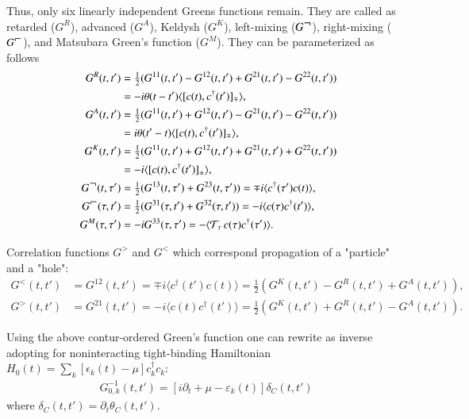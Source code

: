 Thus, only six linearly independent Greens functions remain. They are called as retarded ($G^R$), advanced ($G^A$), Keldysh ($G^K$), left-mixing ($G^{\mbox{$\neg$}}$), right-mixing ($G^{\rh}$), and Matsubara Green's function ($G^M$). They can be parameterized as follows
\begin{subequations}
\label{physical green def}
\begin{align}
G^R(t,t')
 &=
   \tfrac12(G^{11}(t,t')-G^{12}(t,t')+G^{21}(t,t')-G^{22}(t,t'))
\nonumber
\\
 &=
  -i\theta(t-t') \langle [c(t),c^\dagger(t')]_\mp \rangle,
\\
G^A(t,t')
 &=
   \tfrac12(G^{11}(t,t')+G^{12}(t,t')-G^{21}(t,t')-G^{22}(t,t'))
\nonumber
\\
 &=
  i\theta(t'-t) \langle [c(t),c^\dagger(t')]_\mp \rangle,
\label{advanced green def}
\\
G^K(t,t')
 &=
   \tfrac12(G^{11}(t,t')+G^{12}(t,t')+G^{21}(t,t')+G^{22}(t,t'))
\nonumber
\\
 &=
  -i \langle [c(t),c^\dagger(t')]_\pm \rangle,
\label{keldysh green function}
\\
G^{\lh}(t,\tau ')
 &=
   \tfrac12(G^{13}(t,\tau ')+G^{23}(t,\tau '))
 =
   \mp i \langle c^\dagger(\tau ') c(t) \rangle,
\\
G^{\rh}(\tau, t')
 &=
   \tfrac12(G^{31}(\tau,t')+G^{32}(\tau,t'))
 =
   -i\langle c(\tau) c^\dagger(t') \rangle,
\\ \:
\:G^M(\tau,\tau ')
 &=
   -iG^{33}(\tau,\tau')
 =
   -\langle \mathcal{T}_\tau\, c(\tau) c^\dagger(\tau ') \rangle.  
\end{align}
\end{subequations}

Correlation functions $G^{>}$ and $G^{<}$ which correspond propagation of a "particle" and a "hole":
\begin{align}
\label{gles def}
 G^<(t,t')
  &=
   G^{12}(t,t')
  =
   \mp i \langle c^\dagger(t') c(t) \rangle
  = \tfrac12
   (G^K(t,t')-G^R(t,t')+G^A(t,t')),  
 \\
\label{ggtr def}
 G^>(t,t')
  &=
   G^{21}(t,t')
  =
   -i \langle c(t) c^\dagger(t') \rangle
  = \tfrac12
   (G^K(t,t')+G^R(t,t')-G^A(t,t')).
\end{align}

Using the above contur-ordered Green's function one can rewrite as inverse adopting for noninteracting tight-binding Hamiltonian $H_0(t)=\sum_k[\epsilon_k(t)-\mu]c_k^\dagger c_k$:
\begin{align}
\label{G0inv_k}
G^{-1}_{0,k}(t,t')=[i\partial_t+\mu -\varepsilon_k(t)]\delta_C(t,t')
\end{align}
where $\delta_C(t,t')=\partial_t \theta_C(t,t')$.

